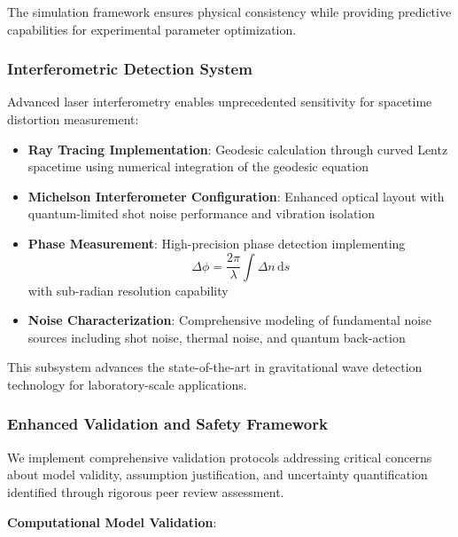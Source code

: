 \documentclass[12pt,a4paper]{article}
\newcommand{\dd}[1]{\,\mathrm{d}#1}
\begin{document}
The simulation framework ensures physical consistency while providing predictive capabilities for experimental parameter optimization.

\subsubsection{Interferometric Detection System}

Advanced laser interferometry enables unprecedented sensitivity for spacetime distortion measurement:

\begin{itemize}
\item \textbf{Ray Tracing Implementation}: Geodesic calculation through curved Lentz spacetime using numerical integration of the geodesic equation
\item \textbf{Michelson Interferometer Configuration}: Enhanced optical layout with quantum-limited shot noise performance and vibration isolation
\item \textbf{Phase Measurement}: High-precision phase detection implementing 
\begin{equation}
\Delta\phi = \frac{2\pi}{\lambda} \int \Delta n \dd{s}
\end{equation}
with sub-radian resolution capability
\item \textbf{Noise Characterization}: Comprehensive modeling of fundamental noise sources including shot noise, thermal noise, and quantum back-action
\end{itemize}

This subsystem advances the state-of-the-art in gravitational wave detection technology for laboratory-scale applications.

\subsubsection{Enhanced Validation and Safety Framework}

We implement comprehensive validation protocols addressing critical concerns about model validity, assumption justification, and uncertainty quantification identified through rigorous peer review assessment.

\textbf{Computational Model Validation}:
\end{document}
